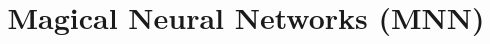 \documentclass[10pt,twocolumn]{article}
\title{Magical Neural Networks (MNN)}
\begin{document}
\maketitle

\begin{abstract}
    
\end{abstract}








  
\pagebreak
\appendix

\end{document}
